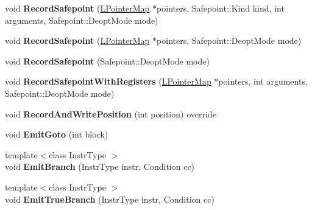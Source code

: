 \begin{DoxyCompactItemize}
\item 
void {\bfseries Record\+Safepoint} (\hyperlink{classv8_1_1internal_1_1_l_pointer_map}{L\+Pointer\+Map} $\ast$pointers, Safepoint\+::\+Kind kind, int arguments, Safepoint\+::\+Deopt\+Mode mode)\hypertarget{classv8_1_1internal_1_1_l_code_gen_a5c5e6c0360111f74e6c274c456c70b74}{}\label{classv8_1_1internal_1_1_l_code_gen_a5c5e6c0360111f74e6c274c456c70b74}

\item 
void {\bfseries Record\+Safepoint} (\hyperlink{classv8_1_1internal_1_1_l_pointer_map}{L\+Pointer\+Map} $\ast$pointers, Safepoint\+::\+Deopt\+Mode mode)\hypertarget{classv8_1_1internal_1_1_l_code_gen_a7f742e0bc068c384673a3490e15b230c}{}\label{classv8_1_1internal_1_1_l_code_gen_a7f742e0bc068c384673a3490e15b230c}

\item 
void {\bfseries Record\+Safepoint} (Safepoint\+::\+Deopt\+Mode mode)\hypertarget{classv8_1_1internal_1_1_l_code_gen_a3621dccea782082b57057f617a9dd24a}{}\label{classv8_1_1internal_1_1_l_code_gen_a3621dccea782082b57057f617a9dd24a}

\item 
void {\bfseries Record\+Safepoint\+With\+Registers} (\hyperlink{classv8_1_1internal_1_1_l_pointer_map}{L\+Pointer\+Map} $\ast$pointers, int arguments, Safepoint\+::\+Deopt\+Mode mode)\hypertarget{classv8_1_1internal_1_1_l_code_gen_a15c074803ff1d0270234efb3e8830c75}{}\label{classv8_1_1internal_1_1_l_code_gen_a15c074803ff1d0270234efb3e8830c75}

\item 
void {\bfseries Record\+And\+Write\+Position} (int position) override\hypertarget{classv8_1_1internal_1_1_l_code_gen_a7f2c2fb5fe21ed4f96fa43839a3c459d}{}\label{classv8_1_1internal_1_1_l_code_gen_a7f2c2fb5fe21ed4f96fa43839a3c459d}

\item 
void {\bfseries Emit\+Goto} (int block)\hypertarget{classv8_1_1internal_1_1_l_code_gen_a77ef06fc94dce505c88f628d129c114d}{}\label{classv8_1_1internal_1_1_l_code_gen_a77ef06fc94dce505c88f628d129c114d}

\item 
{\footnotesize template$<$class Instr\+Type $>$ }\\void {\bfseries Emit\+Branch} (Instr\+Type instr, Condition cc)\hypertarget{classv8_1_1internal_1_1_l_code_gen_a1f6bfaf873f88f28eced1930c1974403}{}\label{classv8_1_1internal_1_1_l_code_gen_a1f6bfaf873f88f28eced1930c1974403}

\item 
{\footnotesize template$<$class Instr\+Type $>$ }\\void {\bfseries Emit\+True\+Branch} (Instr\+Type instr, Condition cc)\hypertarget{classv8_1_1internal_1_1_l_code_gen_af0b023b0c5bfdac97e10cf47560adf62}{}\label{classv8_1_1internal_1_1_l_code_gen_af0b023b0c5bfdac97e10cf47560adf62}


\end{DoxyCompactItemize}
